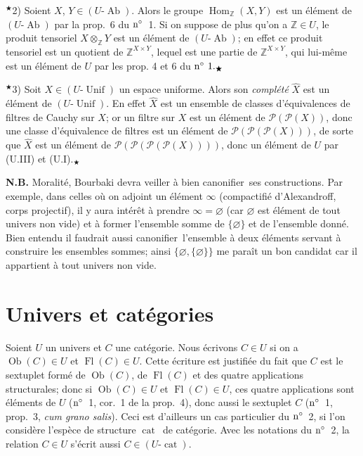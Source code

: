 \documentclass[12pt]{article}
\newcommand{\nn}{\noindent}
\newcommand{\Ab}{\operatorname{Ab}}
\newcommand{\Hom}{\operatorname{Hom}}
\newcommand{\ZZ}{\mathbb Z}
\newcommand{\Unif}{\operatorname{Unif}}
\newcommand{\Ob}{\operatorname{Ob}}
\newcommand{\cat}{\operatorname{cat}}
\newcommand{\Fl}{\operatorname{Fl}}
\begin{document}
\nn${}^\bigstar$2) Soient $X$, $Y\in (U\text{-}\Ab)$. Alors le groupe $\Hom_{\ZZ}(X,Y)$ est un élément de $(U\text{-}\Ab)$ par la prop.~6 du $\rm n^\circ$~1. Si on suppose de plus qu'on a $\ZZ\in U$, le produit tensoriel $X\otimes_{\ZZ}Y$ est un élément de $(U\text{-}\Ab)$; en effet ce produit tensoriel est un quotient de $\ZZ^{X\times Y}$, lequel est une partie de $\ZZ^{X\times Y}$, qui lui-même est un élément de $U$ par les prop. 4 et 6 du $\rm n^\circ\ 1.{}_\bigstar$

\nn${}^\bigstar$3) Soit $X\in (U\text{-}\Unif)$ un espace uniforme. Alors son \emph{complété} $\widehat{X}$ est un élément de $(U\text{-}\Unif)$. En effet $\widehat{X}$ est un ensemble de classes d'équivalences de filtres de Cauchy sur $X$; or un filtre sur $X$ est un élément de $\mathcal{P}(\mathcal{P}(X))$, donc une classe d'équivalence de filtres est un élément de $\mathcal{P}(\mathcal{P}(\mathcal{P}(X)))$, de sorte que $\widehat{X}$ est un élément de $\mathcal{P}(\mathcal{P}(\mathcal{P}(\mathcal{P}(X))))$, donc un élément de $U$ par (U.III) et (U.I).${}_\bigstar$

\nn\textbf{N.B.} Moralité, Bourbaki devra veiller à bien \og canonifier\fg\ ses constructions. Par exemple, dans celles où on adjoint un élément $\infty$ (compactifié d'Alexandroff, corps projectif), il y aura intérêt à prendre $\infty =\varnothing$ (car $\varnothing$ est élément de tout univers non vide) et à former l'ensemble somme de $\{\varnothing\}$ et de l'ensemble donné. Bien entendu il faudrait aussi \og canonifier\fg\ l'ensemble à deux éléments servant à construire les ensembles sommes; ainsi $\{\varnothing,\{\varnothing\}\}$ me paraît un bon candidat car il appartient à tout univers non vide.

\section{Univers et catégories}

Soient $U$ un univers et $C$ une catégorie. Nous écrivons $C\in U$ si on a $\Ob(C)\in U$ et $\Fl(C)\in U$.  Cette écriture est justifiée du fait que $C$ est le sextuplet formé de $\Ob(C)$, de $\Fl(C)$ et des quatre applications structurales; donc si $\Ob(C)\in U$ et $\Fl(C)\in U$, ces quatre applications sont éléments de $U$ ($\rm n^\circ$~1, cor.~1 de la prop.~4), donc aussi le sextuplet $C$ ($\rm n^\circ$~1, prop.~3, \emph{cum grano salis}). Ceci est d'ailleurs un cas particulier du $\rm n^\circ$~2, si l'on considère l'espèce de structure \og$\cat$\fg\ de catégorie. Avec les notations du $\rm n^\circ$~2, la relation $C\in U$ s'écrit aussi $C\in (U\text{-}\cat)$.
\end{document}
